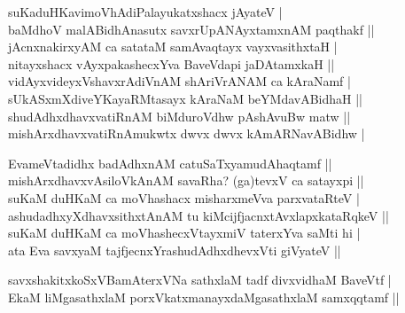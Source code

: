 \begin{entry}
\begin{shl}
suKaduHKavimoVhAdiPalayukatxshacx jAyateV |\\[2pt]
baMdhoV malABidhAnasutx savxrUpANAyxtamxnAM paqthakf ||\\[2pt]
jAcnxnakirxyAM ca satataM samAvaqtayx vayxvasithxtaH |\\[2pt]
nitayxshacx vAyxpakashecxYva BaveVdapi jaDAtamxkaH ||\\[2pt]
vidAyxvideyxVshavxrAdiVnAM shAriVrANAM ca kAraNamf |\\[2pt]
sUkASxmXdiveYKayaRMtasayx kAraNaM beYMdavABidhaH ||\\[2pt]
shudAdhxdhavxvatiRnAM biMduroVdhw pAshAvuBw matw ||\\[2pt]
mishArxdhavxvatiRnAmukwtx dwvx dwvx kAmARNavABidhw |
\end{shl}

\begin{shl}
EvameVtadidhx badAdhxnAM catuSaTxyamudAhaqtamf ||\\[2pt]
mishArxdhavxvAsiloVkAnAM savaRha? (ga)tevxV ca satayxpi ||\\[2pt]
suKaM duHKaM ca moVhashacx misharxmeVva parxvataRteV |\\[2pt]
ashudadhxyXdhavxsithxtAnAM tu kiMcijfjacnxtAvxlapxkataRqkeV ||\\[2pt]
suKaM duHKaM ca moVhashecxVtayxmiV taterxYva saMti hi |\\[2pt]
ata Eva savxyaM tajfjecnxYrashudAdhxdhevxVti giVyateV ||\\[-1pt]
\end{shl}
\medskip
{}
\medskip
{}
\medskip
\begin{shl}
savxshakitxkoSxVBamAterxVNa sathxlaM tadf divxvidhaM BaveVtf |\\[2pt]
EkaM liMgasathxlaM porxVkatxmanayxdaMgasathxlaM samxqqtamf ||\\[-1pt]

\end{shl}
\end{entry}
